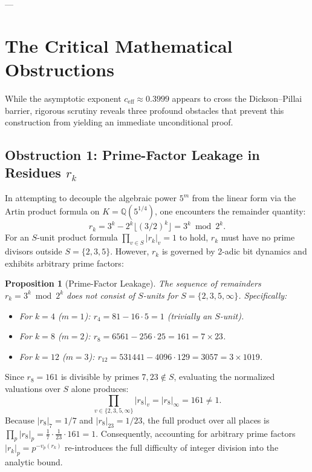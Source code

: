 \documentclass[11pt,reqno]{article}
\theoremstyle{plain}
\newtheorem{proposition}[theorem]{Proposition}
\theoremstyle{definition}
\numberwithin{equation}{section}
\begin{document}
---

\section{The Critical Mathematical Obstructions}

While the asymptotic exponent $c_{\mathrm{eff}} \approx 0.3999$ appears to cross the Dickson--Pillai barrier, rigorous scrutiny reveals three profound obstacles that prevent this construction from yielding an immediate unconditional proof.

\subsection{Obstruction 1: Prime-Factor Leakage in Residues $r_k$}
In attempting to decouple the algebraic power $5^m$ from the linear form via the Artin product formula on $K = \mathbb{Q}(5^{1/4})$, one encounters the remainder quantity:
\begin{equation}
r_k = 3^k - 2^k \lfloor(3/2)^k\rfloor = 3^k \bmod 2^k.
\end{equation}
For an $S$-unit product formula $\prod_{v \in S} |r_k|_v = 1$ to hold, $r_k$ must have no prime divisors outside $S = \{2, 3, 5\}$. However, $r_k$ is governed by 2-adic bit dynamics and exhibits arbitrary prime factors:

\begin{proposition}[Prime-Factor Leakage]\label{prop:leakage}
The sequence of remainders $r_k = 3^k \bmod 2^k$ does not consist of $S$-units for $S = \{2, 3, 5, \infty\}$. Specifically:
\begin{itemize}
    \item For $k = 4$ ($m=1$): $r_4 = 81 - 16 \cdot 5 = 1$ (trivially an $S$-unit).
    \item For $k = 8$ ($m=2$): $r_8 = 6561 - 256 \cdot 25 = 161 = 7 \times 23$.
    \item For $k = 12$ ($m=3$): $r_{12} = 531441 - 4096 \cdot 129 = 3057 = 3 \times 1019$.
\end{itemize}
\end{proposition}

Since $r_8 = 161$ is divisible by primes $7, 23 \notin S$, evaluating the normalized valuations over $S$ alone produces:
\begin{equation}
\prod_{v \in \{2, 3, 5, \infty\}} |r_8|_v = |r_8|_\infty = 161 \ne 1.
\end{equation}
Because $|r_8|_7 = 1/7$ and $|r_8|_{23} = 1/23$, the full product over all places is $\prod_{p} |r_8|_p = \frac{1}{7} \cdot \frac{1}{23} \cdot 161 = 1$. Consequently, accounting for arbitrary prime factors $|r_k|_p = p^{-v_p(r_k)}$ re-introduces the full difficulty of integer division into the analytic bound.
\end{document}

